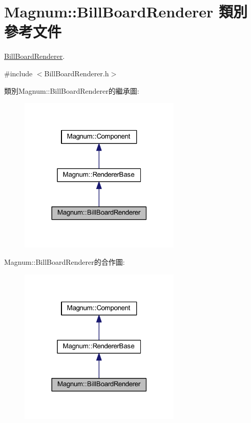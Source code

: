 \hypertarget{class_magnum_1_1_bill_board_renderer}{}\section{Magnum\+:\+:Bill\+Board\+Renderer 類別 參考文件}
\label{class_magnum_1_1_bill_board_renderer}


\hyperlink{class_magnum_1_1_bill_board_renderer}{Bill\+Board\+Renderer}.  




{\ttfamily \#include $<$Bill\+Board\+Renderer.\+h$>$}



類別\+Magnum\+:\+:Bill\+Board\+Renderer的繼承圖\+:\nopagebreak
\begin{figure}[H]
\begin{center}
\leavevmode
\includegraphics[width=218pt]{class_magnum_1_1_bill_board_renderer__inherit__graph}
\end{center}
\end{figure}


Magnum\+:\+:Bill\+Board\+Renderer的合作圖\+:\nopagebreak
\begin{figure}[H]
\begin{center}
\leavevmode
\includegraphics[width=218pt]{class_magnum_1_1_bill_board_renderer__coll__graph}
\end{center}
\end{figure}

